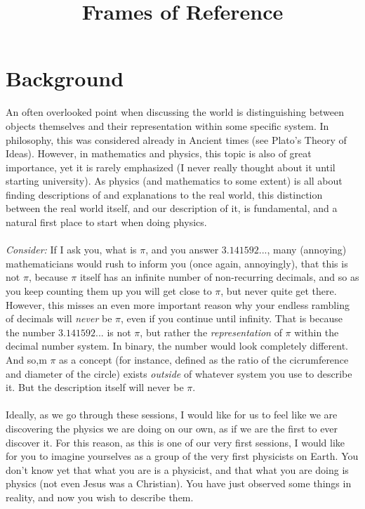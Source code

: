 \documentclass{article}
\title{Frames of Reference}
\date{}
\begin{document}
\maketitle

\section{Background}
An often overlooked point when discussing the world is distinguishing between objects themselves and their representation within some specific system. In philosophy, this was considered already in Ancient times (see Plato's Theory of Ideas). However, in mathematics and physics, this topic is also of great importance, yet it is rarely emphasized (I never really thought about it until starting university). As physics (and mathematics to some extent) is all about finding descriptions of and explanations to the real world, this distinction between the real world itself, and our description of it, is fundamental, and a natural first place to start when doing physics.
\\\\
\textit{Consider:} If I ask you, what is \textit{$\pi$}, and you answer $3.141592...$, many (annoying) mathematicians would rush to inform you (once again, annoyingly), that this is not $\pi$, because $\pi$ itself has an infinite number of non-recurring decimals, and so as you keep counting them up you will get close to $\pi$, but never quite get there. However, this misses an even more important reason why your endless rambling of decimals will \textit{never} be $\pi$, even if you continue until infinity. That is because the number $3.141592...$ is not $\pi$, but rather the \textit{representation} of $\pi$ within the decimal number system. In binary, the number would look completely different. And so,m $\pi$ as a concept (for instance, defined as the ratio of the cicrumference and diameter of the circle) exists \textit{outside} of whatever system you use to describe it. But the description itself will never be $\pi$.
\\\\
Ideally, as we go through these sessions, I would like for us to feel like we are discovering the physics we are doing on our own, as if we are the first to ever discover it. For this reason, as this is one of our very first sessions, I would like for you to imagine yourselves as a group of the very first physicists on Earth. You don't know yet that what you are is a physicist, and that what you are doing is physics (not even Jesus was a Christian). You have just observed some things in reality, and now you wish to describe them.
\end{document}
